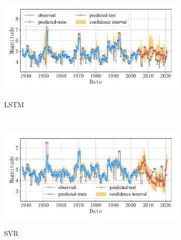 \begin{figure}[!htbp]
  \centering
  \begin{subfigure}[b]{0.45\textwidth}
    \caption{LSTM}
    \vspace{-0.2cm}
    \includegraphics[width=\textwidth]{Img/chap5_seism/block4/seism_lstm_minyear_1932_maxyear_2021_spanlat_2_spanlon_4_timewindow_72_nextmonth_12_minmag_3.0_block_4.pdf}
    \vspace{-1cm}
    \label{fig:seism_lstm_minyear_1932_maxyear_2021_spanlat_2_spanlon_4_timewindow_72_nextmonth_12_minmag_3.0_block_4}
  \end{subfigure}
  ~
  \begin{subfigure}[b]{0.45\textwidth}
    \caption{SVR} 
    \vspace{-0.2cm}
    \includegraphics[width=\textwidth]{Img/chap5_seism/block4/seism_svr_minyear_1932_maxyear_2021_spanlat_2_spanlon_4_timewindow_72_nextmonth_12_minmag_3.0_block_4.pdf}
    \vspace{-1cm}
    \label{fig:seism_svr_minyear_1932_maxyear_2021_spanlat_2_spanlon_4_timewindow_72_nextmonth_12_minmag_3.0_block_4}
  \end{subfigure}   
  \\
  \begin{subfigure}[b]{0.45\textwidth}

\end{subfigure}
\end{figure}
